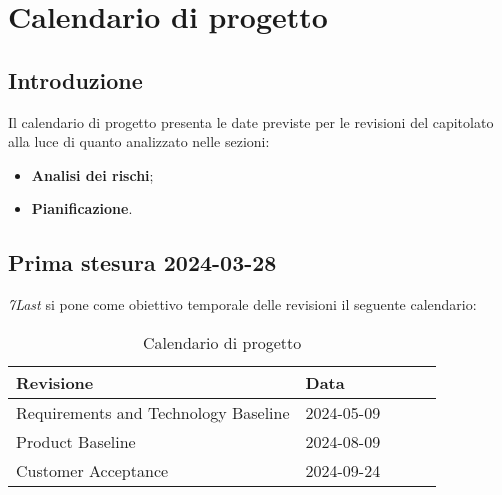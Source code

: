 \section{Calendario di progetto}
\subsection{Introduzione}
Il calendario di progetto presenta le date previste per le revisioni del capitolato alla luce di quanto analizzato nelle sezioni:
\begin{itemize}
    \item \textbf{Analisi dei rischi};
    \item \textbf{Pianificazione}.
\end{itemize}

\subsection{Prima stesura 2024-03-28}
\textit{7Last} si pone come obiettivo temporale delle revisioni il seguente calendario:
\begin{table}[!h]
    \begin{center}
        \begin{tabular}{ | l | l | l | l | l | }
            \hline
            Revisione                               & Data       \\ \hline
            Requirements and Technology Baseline    & 2024-05-09 \\
            Product Baseline                        & 2024-08-09 \\
            Customer Acceptance                     & 2024-09-24 \\
            \hline
        \end{tabular}
    \end{center}
    \caption{Calendario di progetto}
    \label{tab:10}
\end{table}

